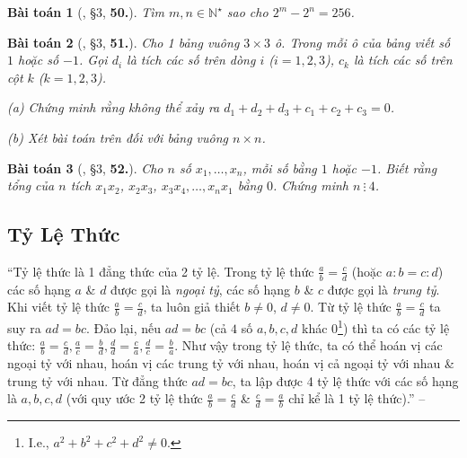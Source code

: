 \documentclass{article}
\numberwithin{equation}{section}
\newtheorem{baitoan}{Bài toán}[section]
\begin{document}
\begin{baitoan}[\cite{Binh_Toan_7_tap_1}, \S3, \textbf{50.}]
	Tìm $m,n\in\mathbb{N}^\star$ sao cho $2^m - 2^n = 256$.
\end{baitoan}

\begin{baitoan}[\cite{Binh_Toan_7_tap_1}, \S3, \textbf{51.}]
	Cho 1 bảng vuông $3\times 3$ ô. Trong mỗi ô của bảng viết số $1$ hoặc số $-1$. Gọi $d_i$ là tích các số trên dòng $i$ ($i = 1,2,3$), $c_k$ là tích các số trên cột $k$ ($k = 1,2,3$).
	\begin{enumerate*}
		\item[(a)] Chứng minh rằng không thể xảy ra $d_1 + d_2 + d_3 + c_1 + c_2 + c_3 = 0$.
		\item[(b)] Xét bài toán trên đối với bảng vuông $n\times n$.
	\end{enumerate*}
\end{baitoan}

\begin{baitoan}[\cite{Binh_Toan_7_tap_1}, \S3, \textbf{52.}]
	Cho $n$ số $x_1,\ldots,x_n$, mỗi số bằng $1$ hoặc $-1$. Biết rằng tổng của $n$ tích $x_1x_2$, $x_2x_3$, $x_3x_4,\ldots,x_nx_1$ bằng $0$. Chứng minh $n\ \vdots\ 4$.
\end{baitoan}


\subsection{Tỷ Lệ Thức}
``Tỷ lệ thức là 1 đẳng thức của 2 tỷ lệ. Trong tỷ lệ thức $\frac{a}{b} = \frac{c}{d}$ (hoặc $a:b = c:d$) các số hạng $a$ \& $d$ được gọi là \textit{ngoại tỷ}, các số hạng $b$ \& $c$ được gọi là \textit{trung tỷ}. Khi viết tỷ lệ thức $\frac{a}{b} = \frac{c}{d}$, ta luôn giả thiết $b\ne 0$, $d\ne 0$. Từ tỷ lệ thức $\frac{a}{b} = \frac{c}{d}$ ta suy ra $ad = bc$. Đảo lại, nếu $ad = bc$ (cả $4$ số $a,b,c,d$ khác $0$\footnote{I.e., $a^2 + b^2 + c^2 + d^2\ne 0$.}) thì ta có các tỷ lệ thức: $\frac{a}{b} = \frac{c}{d},\frac{a}{c} = \frac{b}{d},\frac{d}{d} = \frac{c}{a},\frac{d}{c} = \frac{b}{a}$. Như vậy trong tỷ lệ thức, ta có thể hoán vị các ngoại tỷ với nhau, hoán vị các trung tỷ với nhau, hoán vị cả ngoại tỷ với nhau \& trung tỷ với nhau. Từ đẳng thức $ad = bc$, ta lập được 4 tỷ lệ thức với các số hạng là $a,b,c,d$ (với quy ước 2 tỷ lệ thức $\frac{a}{b} = \frac{c}{d}$ \& $\frac{c}{d} = \frac{a}{b}$ chỉ kể là 1 tỷ lệ thức).'' -- \cite[\S4]{Binh_Toan_7_tap_1}
\end{document}
